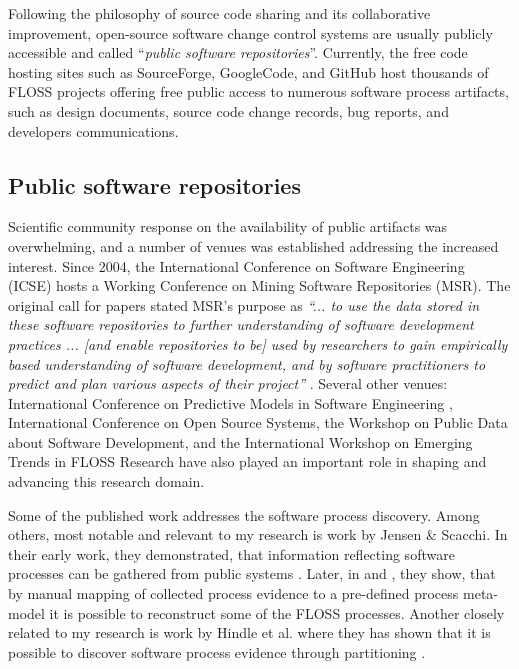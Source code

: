 Following the philosophy of source code sharing and its collaborative improvement, open-source software 
change control systems are usually publicly accessible and called ``\textit{public software repositories}''.
Currently, the free code hosting sites such as SourceForge, GoogleCode, and GitHub host thousands of FLOSS 
projects offering free public access to numerous software process artifacts, such as design documents, source code
change records, bug reports, and developers communications.

\subsection{Public software repositories}
Scientific community response on the availability of public artifacts was overwhelming, and a number of 
venues was established addressing the increased interest. 
Since 2004, the International Conference on Software Engineering (ICSE) hosts a Working Conference on 
Mining Software Repositories (MSR). The original call for papers stated MSR's purpose as 
\textit{``... to use the data stored in these software repositories to further understanding of software 
development practices ... [and enable repositories to be] used by researchers to gain empirically based 
understanding of software development, and by software practitioners to predict and plan various aspects 
of their project''} \cite{msr2004} \cite{citeulike:7853299}. 
Several other venues: International Conference on Predictive Models in Software Engineering \cite{promise12}, 
International Conference on Open Source Systems, the Workshop on Public Data about Software Development, 
and the International Workshop on Emerging Trends in FLOSS Research have also played
an important role in shaping and advancing this research domain.

Some of the published work addresses the software process discovery. Among others, most notable and 
relevant to my research is work by Jensen \& Scacchi. In their early work, they demonstrated, that 
information reflecting software processes can be gathered from public systems \cite{citeulike:12550640}. 
Later, in \cite{citeulike:5043664} and \cite{citeulike:5128808}, they show, that by manual mapping of 
collected process evidence to a pre-defined process meta-model it is possible to reconstruct some 
of the FLOSS processes. 
Another closely related to my research is work by Hindle et al. where they has shown that it is possible to 
discover software process evidence through partitioning \cite{citeulike:10377366}.

